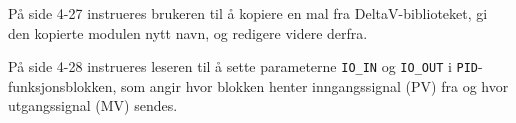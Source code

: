












På side 4-27 instrueres brukeren til å kopiere en mal fra DeltaV-biblioteket, gi den kopierte modulen nytt navn, og redigere videre derfra.

\vskip 10pt

På side 4-28 instrueres leseren til å sette parameterne {\tt IO\_IN} og {\tt IO\_OUT} i {\tt PID}-funksjonsblokken, som angir hvor blokken henter inngangssignal (PV) fra og hvor utgangssignal (MV) sendes.


